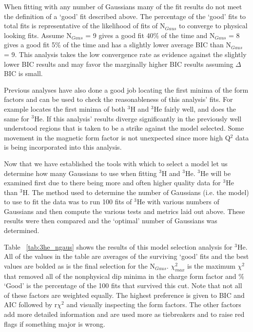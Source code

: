 When fitting with any number of Gaussians many of the fit results do not meet the definition of a `good' fit described above. The percentage of the `good' fits to total fits is representative of the likelihood of fits of N$_{Gaus}$ to converge to physical looking fits. Assume N$_{Gaus}$ = 9 gives a good fit 40$\%$ of the time and N$_{Gaus}$ = 8 gives a good fit 5$\%$ of the time and has a slightly lower average BIC than N$_{Gaus}$ = 9. This analysis takes the low convergence rate as evidence against the slightly lower BIC results and may favor the marginally higher BIC results assuming $\Delta$BIC is small. 

Previous analyses have also done a good job locating the first minima of the form factors and can be used to check the reasonableness of this analysis' fits. For example \cite{Article:Amroun} locates the first minima of both $^3$H and $^3$He fairly well, and \cite{Article:Alex} does the same for $^3$He. If this analysis' results diverge significantly in the previously well understood regions that is taken to be a strike against the model selected. Some movement in the magnetic form factor is not unexpected since more high Q$^2$ data is being incorporated into this analysis.

Now that we have established the tools with which to select a model let us determine how many Gaussians to use when fitting $^3$H and $^3$He. $^3$He will be examined first due to there being more and often higher quality data for $^3$He than $^3$H. The method used to determine the number of Gaussians (i.e. the model) to use to fit the data was to run 100 fits of $^3$He with various numbers of Gaussians and then compute the various tests and metrics laid out above. These results were then compared and the `optimal' number of Gaussians was determined.

Table ~\ref{tab:3he_ngaus} shows the results of this model selection analysis for $^3$He. All of the values in the table are averages of the surviving `good' fits and the best values are bolded as is the final selection for the N$_{Gaus}$. $\chi^2_{max}$ is the maximum $\chi^2$ that removed all of the nonphysical dip minima in the charge form factor and $\%$ `Good' is the percentage of the 100 fits that survived this cut. Note that not all of these factors are weighted equally. The highest preference is given to BIC and AIC followed by r$\chi^2$ and visually inspecting the form factors. The other factors add more detailed information and are used more as tiebreakers and to raise red flags if something major is wrong.

